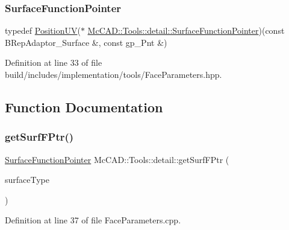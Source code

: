 \subsubsection{\texorpdfstring{Surface\+Function\+Pointer}{SurfaceFunctionPointer}}
{\footnotesize\ttfamily typedef \hyperlink{structMcCAD_1_1Tools_1_1PositionUV}{Position\+UV}($\ast$ \hyperlink{namespaceMcCAD_1_1Tools_1_1detail_a1e45a87ac7426f4a0d25bdecb437dcce}{Mc\+C\+A\+D\+::\+Tools\+::detail\+::\+Surface\+Function\+Pointer})(const B\+Rep\+Adaptor\+\_\+\+Surface \&, const gp\+\_\+\+Pnt \&)}



Definition at line 33 of file build/includes/implementation/tools/\+Face\+Parameters.\+hpp.



\subsection{Function Documentation}
\mbox{\label{namespaceMcCAD_1_1Tools_1_1detail_a119ac0e14da83e25dcc976a37b4e7f3f}} 
\subsubsection{\texorpdfstring{get\+Surf\+F\+Ptr()}{getSurfFPtr()}}
{\footnotesize\ttfamily \hyperlink{namespaceMcCAD_1_1Tools_1_1detail_a1e45a87ac7426f4a0d25bdecb437dcce}{Surface\+Function\+Pointer} Mc\+C\+A\+D\+::\+Tools\+::detail\+::get\+Surf\+F\+Ptr (\begin{DoxyParamCaption}\item[{Geom\+Abs\+\_\+\+Surface\+Type}]{surface\+Type }\end{DoxyParamCaption})}



Definition at line 37 of file Face\+Parameters.\+cpp.


